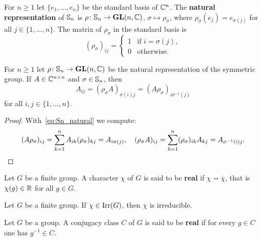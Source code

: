


For $n\geq1$ let $\{e_1,\dots,e_n\}$ be the standard basis of $\mathbb{C}^n$.  
The \textbf{natural representation} of $\mathbb{S}_n$ is 
$\rho\colon\mathbb{S}_n\to\mathbf{GL}(n,\mathbb{C})$, $\sigma\mapsto\rho_{\sigma}$, 
where $\rho_\sigma(e_j)=e_{\sigma(j)}$ for all $j\in\{1,\dots,n\}$. 
The matrix of $\rho_\sigma$ in the standard basis is  
\begin{equation}
    \label{eq:Sn_natural}
    (\rho_\sigma)_{ij}=\begin{cases}
      1 & \text{if $i=\sigma(j)$},\\
      0 & \text{otherwise}.
    \end{cases}
\end{equation}

\begin{lemma}
	\label{lem:permutaciones}
	For $n\geq1$ let $\rho\colon\mathbb{S}_n\to\mathbf{GL}(n,\mathbb{C})$ be the natural 
	representation of the symmetric group. 
	If $A\in\mathbb{C}^{n\times n}$ and $\sigma\in\mathbb{S}_n$, then
	\[
		A_{ij}=(\rho_{\sigma}A)_{\sigma(i)j}=(A\rho_{\sigma})_{i\sigma^{-1}(j)}
	\]
    for all $i,j\in\{1,\dots,n\}$.
\end{lemma}

\begin{proof}
	With~\eqref{eq:Sn_natural} we compute:
	\[
		(A\rho_{\sigma})_{ij}=\sum_{k=1}^n A_{ik}(\rho_{\sigma})_{kj}=A_{i\sigma(j)},
		\quad
		(\rho_\sigma A)_{ij}=\sum_{k=1}^n (\rho_\sigma)_{ik}A_{kj}=A_{\sigma^{-1}(i)j}.\qedhere
	\]
\end{proof}

\begin{definition}
  Let $G$ be a finite group. A character $\chi$ of $G$ is said to be
  \textbf{real} if
  $\chi=\overline{\chi}$, that is $\chi(g)\in\mathbb{R}$ for all $g\in G$. 
\end{definition}

\begin{exercise}
	\label{xca:chi_irreducible}
	Let $G$ be a finite group. If $\chi\in\operatorname{Irr}(G)$, then 
	$\overline{\chi}$ is irreducible.
\end{exercise}

\begin{definition}
  Let $G$ be a group. A conjugacy class $C$ of $G$ is said to be
  \textbf{real} if for every $g\in C$ one has $g^{-1}\in C$. 
\end{definition}

